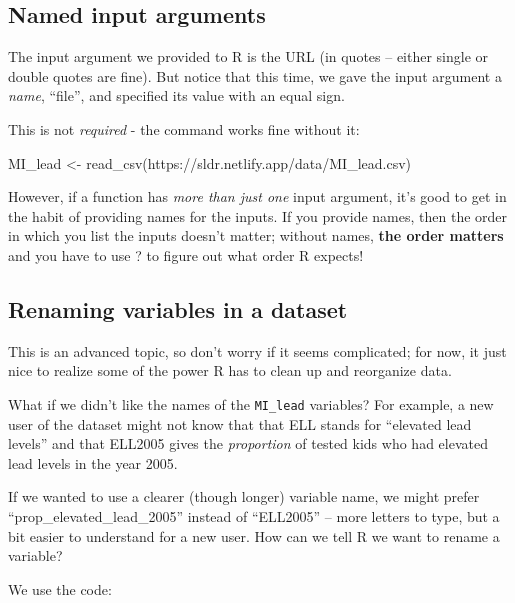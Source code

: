 \documentclass[
  letterpaper,
  DIV=11,
  numbers=noendperiod]{scrreprt}
\newenvironment{Shaded}{\begin{snugshade}}{\end{snugshade}}
\newcommand{\FunctionTok}[1]{\textcolor[rgb]{0.28,0.35,0.67}{#1}}
\newcommand{\NormalTok}[1]{\textcolor[rgb]{0.00,0.23,0.31}{#1}}
\newcommand{\OtherTok}[1]{\textcolor[rgb]{0.00,0.23,0.31}{#1}}
\newcommand{\StringTok}[1]{\textcolor[rgb]{0.13,0.47,0.30}{#1}}
\theoremstyle{remark}
\begin{document}
\subsection{Named input arguments}\label{named-input-arguments}

The input argument we provided to R is the URL (in quotes -- either
single or double quotes are fine). But notice that this time, we gave
the input argument a \emph{name}, ``file'', and specified its value with
an equal sign.

This is not \emph{required} - the command works fine without it:

\begin{Shaded}
\begin{Highlighting}[]
\NormalTok{MI\_lead }\OtherTok{\textless{}{-}} \FunctionTok{read\_csv}\NormalTok{(}\StringTok{\textquotesingle{}https://sldr.netlify.app/data/MI\_lead.csv\textquotesingle{}}\NormalTok{)}
\end{Highlighting}
\end{Shaded}

However, if a function has \emph{more than just one} input argument,
it's good to get in the habit of providing names for the inputs. If you
provide names, then the order in which you list the inputs doesn't
matter; without names, \textbf{the order matters} and you have to use ?
to figure out what order R expects!

\subsection{Renaming variables in a
dataset}\label{renaming-variables-in-a-dataset}

This is an advanced topic, so don't worry if it seems complicated; for
now, it just nice to realize some of the power R has to clean up and
reorganize data.

What if we didn't like the names of the \texttt{MI\_lead} variables? For
example, a new user of the dataset might not know that that ELL stands
for ``elevated lead levels'' and that ELL2005 gives the
\emph{proportion} of tested kids who had elevated lead levels in the
year 2005.

If we wanted to use a clearer (though longer) variable name, we might
prefer ``prop\_elevated\_lead\_2005'' instead of ``ELL2005'' -- more
letters to type, but a bit easier to understand for a new user. How can
we tell R we want to rename a variable?

We use the code:
\end{document}
